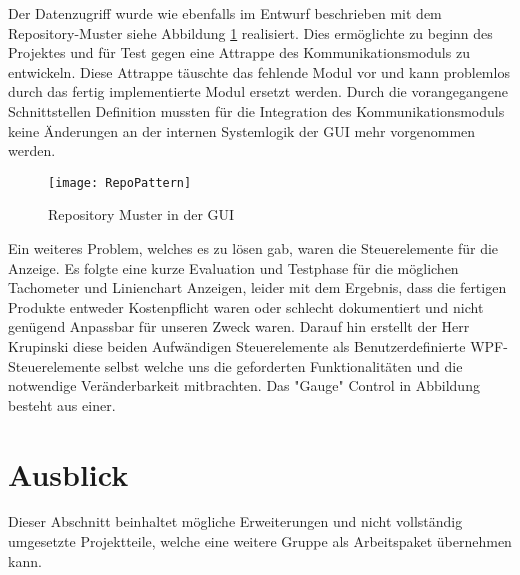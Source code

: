 Der Datenzugriff wurde wie ebenfalls im Entwurf beschrieben mit dem Repository-Muster siehe Abbildung \ref{fig:repo} realisiert. Dies ermöglichte zu beginn des Projektes und für Test gegen eine Attrappe des Kommunikationsmoduls  zu entwickeln. Diese Attrappe täuschte das fehlende Modul vor und kann problemlos durch das fertig implementierte Modul ersetzt werden. Durch die vorangegangene Schnittstellen Definition mussten für die Integration des Kommunikationsmoduls keine Änderungen an der internen Systemlogik der GUI mehr vorgenommen werden.   

\begin{figure}[h]
	\centering
		\texttt{[image: RepoPattern]}
		\caption{Repository Muster in der GUI}
		\label{fig:repo}
\end{figure}

Ein weiteres Problem, welches es zu lösen gab, waren die Steuerelemente für die Anzeige. Es folgte eine kurze Evaluation und Testphase für die möglichen Tachometer und Linienchart Anzeigen, leider mit dem Ergebnis, dass die fertigen Produkte entweder Kostenpflicht waren oder schlecht dokumentiert und nicht genügend Anpassbar für unseren Zweck waren. Darauf hin erstellt der Herr Krupinski diese beiden Aufwändigen Steuerelemente als Benutzerdefinierte WPF-Steuerelemente selbst welche uns die geforderten Funktionalitäten und die notwendige Veränderbarkeit mitbrachten. Das "Gauge" Control in Abbildung besteht aus einer.


\section{Ausblick}
Dieser Abschnitt beinhaltet mögliche Erweiterungen und nicht vollständig umgesetzte Projektteile, welche eine weitere Gruppe als Arbeitspaket übernehmen kann. 




